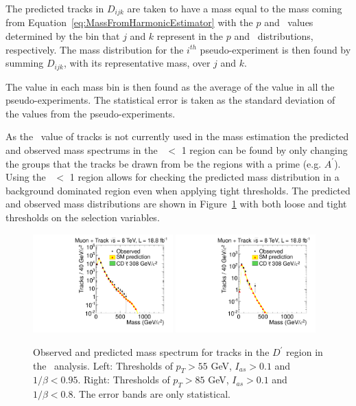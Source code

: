 The predicted tracks in $D_{ijk}$ are taken to have a mass equal to the mass coming from Equation~\ref{eq:MassFromHarmonicEstimator} with the $p$ and \ih\ values
determined by the bin that $j$ and $k$ represent in the $p$ and \ih\ distributions, respectively. The mass distribution for the $i^{th}$ pseudo-experiment is then
found by summing $D_{ijk}$, with its representative mass, over $j$ and $k$.

The value in each mass bin is then found as the average of the value in all the pseudo-experiments. The statistical error is taken as the standard deviation of the values from
the pseudo-experiments.

As the \invbeta\ value of tracks is not currently used in the mass estimation the predicted and observed mass spectrums in the \invbeta\ $<$ 1 region can be
found by only changing the groups that the tracks be drawn from be the regions with a prime (e.g. $A^\prime$). Using the \invbeta\ $<$ 1 region allows for checking
the predicted mass distribution in a background dominated region even when applying tight thresholds. The predicted and observed mass distributions are shown in 
Figure~\ref{fig:FlipMassDistribution} with both loose and tight thresholds on the selection variables.

\begin{figure}
 \begin{center}
  \includegraphics[clip=false, trim=0.0cm 0cm 0.0cm 0cm, width=0.48\textwidth]{figures/tkmu/RescaleNoRatio_Mass_Flip_8TeV_LooseNoSMMC}
  \includegraphics[clip=false, trim=0.0cm 0cm 0.0cm 0cm, width=0.48\textwidth]{figures/tkmu/RescaleNoRatio_Mass_Flip_8TeV_TightNoSMMC}
 \end{center}
 \caption[Observed and predicted mass spectrum for tracks in the \invbeta\ $<$ 1 region in the \tktof\ analysis.]
{Observed and predicted mass spectrum for tracks in the $D^\prime$ region in the \tktof\ analysis.
Left: Thresholds of $p_T > 55$ GeV, $I_{as} > 0.1$ and $1/\beta < 0.95$.
Right: Thresholds of $p_T > 85$ GeV, $I_{as} > 0.1$ and $1/\beta < 0.8$.
The error bands are only statistical.}
\label{fig:FlipMassDistribution}
\end{figure}

